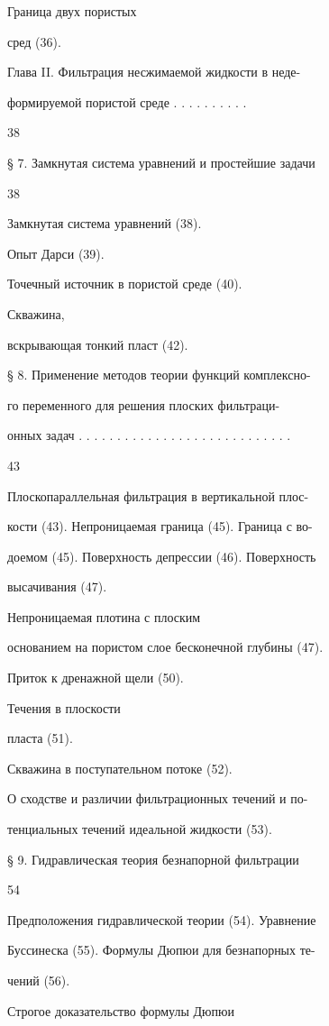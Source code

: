 \documentclass[
  11pt,
]{article}
\begin{document}
Граница двух пористых\par
сред (36).\par
Глава II. Фильтрация несжимаемой жидкости в неде-\par
формируемой пористой среде . . . . . . . . . .\par
38\par
§ 7. Замкнутая система уравнений и простейшие задачи\par
38\par
Замкнутая система уравнений (38).\par
Опыт Дарси (39).\par
Точечный источник в пористой среде (40).\par
Скважина,\par
вскрывающая тонкий пласт (42).\par
§ 8. Применение методов теории функций комплексно-\par
го переменного для решения плоских фильтраци-\par
онных задач . . . . . . . . . . . . . . . . . . . . . . . . . . . .\par
43\par
Плоскопараллельная фильтрация в вертикальной плос-\par
кости (43). Непроницаемая граница (45). Граница с во-\par
доемом (45). Поверхность депрессии (46). Поверхность\par
высачивания (47).\par
Непроницаемая плотина с плоским\par
основанием на пористом слое бесконечной глубины (47).\par
Приток к дренажной щели (50).\par
Течения в плоскости\par
пласта (51).\par
Скважина в поступательном потоке (52).\par
О сходстве и различии фильтрационных течений и по-\par
тенциальных течений идеальной жидкости (53).\par
§ 9. Гидравлическая теория безнапорной фильтрации\par
54\par
Предположения гидравлической теории (54). Уравнение\par
Буссинеска (55). Формулы Дюпюи для безнапорных те-\par
чений (56).\par
Строгое доказательство формулы Дюпюи\par
\end{document}
